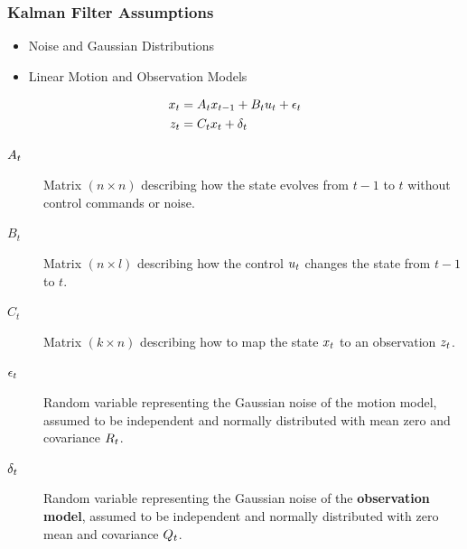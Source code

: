    
\begin{frame}
    \frametitle{Kalman Filter Assumptions}
    \small
    \begin{itemize}
        \item Noise and Gaussian Distributions
        \item Linear Motion and Observation Models
    \end{itemize}
   
    \begin{align*}
    x_{t} &= A_{t} x_{t-1} + B_{t}u_{t} + \epsilon_{t}\\
    z_{t} &= C_{t} x_{t} + \delta_{t}
    \end{align*}
   
    \begin{description}
    \item[$A_{t}$] Matrix $(n \times n)$ describing how the state evolves from $t-1$ to $t$ without control commands or noise.

    \item[$B_{t}$] Matrix $(n \times l)$ describing how the control $u_{t}$ changes the state from $t-1$ to $t$.

    \item[$C_{t}$] Matrix $(k \times n)$ describing how to map the state $x_{t}$ to an observation $z_{t}$.

    \item[$\epsilon_{t}$] Random variable representing the Gaussian noise of the motion model, assumed to be independent and normally distributed with mean zero and covariance $R_{t}$.

    \item[$\delta_{t}$] Random variable representing the Gaussian noise of the {\bf observation model}, assumed to be independent and normally distributed with zero mean and covariance $Q_{t}$.

    \end{description}
   
   
\end{frame}
   
